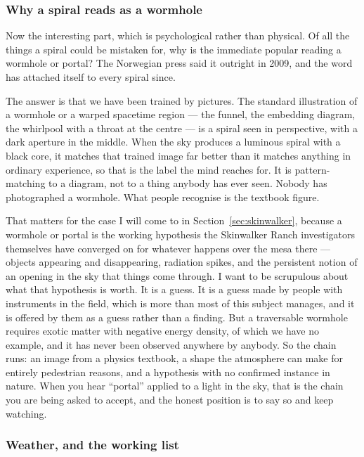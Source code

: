 \subsubsection*{Why a spiral reads as a wormhole}

Now the interesting part, which is psychological rather than physical. Of all the things a spiral
could be mistaken for, why is the immediate popular reading a wormhole or portal? The Norwegian
press said it outright in 2009, and the word has attached itself to every spiral since.

The answer is that we have been trained by pictures. The standard illustration of a wormhole or a
warped spacetime region --- the funnel, the embedding diagram, the whirlpool with a throat at the
centre --- is a spiral seen in perspective, with a dark aperture in the middle. When the sky
produces a luminous spiral with a black core, it matches that trained image far better than it
matches anything in ordinary experience, so that is the label the mind reaches for. It is
pattern-matching to a diagram, not to a thing anybody has ever seen. Nobody has photographed a
wormhole. What people recognise is the textbook figure.

That matters for the case I will come to in Section~\ref{sec:skinwalker}, because a wormhole or
portal is the working hypothesis the Skinwalker Ranch investigators themselves have converged on
for whatever happens over the mesa there --- objects appearing and disappearing, radiation spikes,
and the persistent notion of an opening in the sky that things come through. I want to be scrupulous
about what that hypothesis is worth. It is a guess. It is a guess made by people with instruments
in the field, which is more than most of this subject manages, and it is offered by them as a guess
rather than a finding. But a traversable wormhole requires exotic matter with negative energy
density, of which we have no example, and it has never been observed anywhere by anybody. So the
chain runs: an image from a physics textbook, a shape the atmosphere can make for entirely
pedestrian reasons, and a hypothesis with no confirmed instance in nature. When you hear ``portal''
applied to a light in the sky, that is the chain you are being asked to accept, and the honest
position is to say so and keep watching.

\subsubsection*{Weather, and the working list}

